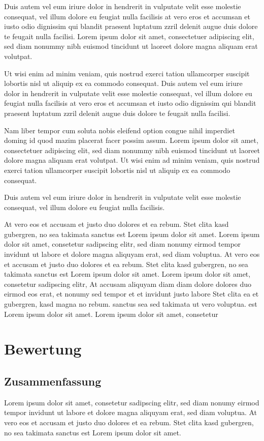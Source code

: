 \documentclass[a4paper,12pt]{article}
\begin{document}
Duis autem vel eum iriure dolor in hendrerit in vulputate velit esse molestie consequat, vel illum dolore eu feugiat nulla facilisis at vero eros et accumsan et iusto odio dignissim qui blandit praesent luptatum zzril delenit augue duis dolore te feugait nulla facilisi. Lorem ipsum dolor sit amet, consectetuer adipiscing elit, sed diam nonummy nibh euismod tincidunt ut laoreet dolore magna aliquam erat volutpat.   

Ut wisi enim ad minim veniam, quis nostrud exerci tation ullamcorper suscipit lobortis nisl ut aliquip ex ea commodo consequat. Duis autem vel eum iriure dolor in hendrerit in vulputate velit esse molestie consequat, vel illum dolore eu feugiat nulla facilisis at vero eros et accumsan et iusto odio dignissim qui blandit praesent luptatum zzril delenit augue duis dolore te feugait nulla facilisi.   

Nam liber tempor cum soluta nobis eleifend option congue nihil imperdiet doming id quod mazim placerat facer possim assum. Lorem ipsum dolor sit amet, consectetuer adipiscing elit, sed diam nonummy nibh euismod tincidunt ut laoreet dolore magna aliquam erat volutpat. Ut wisi enim ad minim veniam, quis nostrud exerci tation ullamcorper suscipit lobortis nisl ut aliquip ex ea commodo consequat.   

Duis autem vel eum iriure dolor in hendrerit in vulputate velit esse molestie consequat, vel illum dolore eu feugiat nulla facilisis.   

At vero eos et accusam et justo duo dolores et ea rebum. Stet clita kasd gubergren, no sea takimata sanctus est Lorem ipsum dolor sit amet. Lorem ipsum dolor sit amet, consetetur sadipscing elitr, sed diam nonumy eirmod tempor invidunt ut labore et dolore magna aliquyam erat, sed diam voluptua. At vero eos et accusam et justo duo dolores et ea rebum. Stet clita kasd gubergren, no sea takimata sanctus est Lorem ipsum dolor sit amet. Lorem ipsum dolor sit amet, consetetur sadipscing elitr, At accusam aliquyam diam diam dolore dolores duo eirmod eos erat, et nonumy sed tempor et et invidunt justo labore Stet clita ea et gubergren, kasd magna no rebum. sanctus sea sed takimata ut vero voluptua. est Lorem ipsum dolor sit amet. Lorem ipsum dolor sit amet, consetetur

\section{Bewertung}

\subsection{Zusammenfassung}
Lorem ipsum dolor sit amet, consetetur sadipscing elitr, sed diam nonumy eirmod tempor invidunt ut labore et dolore magna aliquyam erat, sed diam voluptua. At vero eos et accusam et justo duo dolores et ea rebum. Stet clita kasd gubergren, no sea takimata sanctus est Lorem ipsum dolor sit amet.
\end{document}
